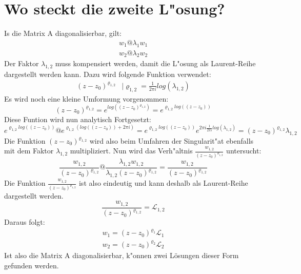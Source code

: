 \chapter{Wo steckt die zweite L"osung?\label{chapter:thema}}
\begin{refsection}

Is die Matrix A diagonalisierbar, gilt:
$$
\begin{matrix}
w_1 @ \lambda_1 w_1  \\
w_2 @ \lambda_2 w_2
\end{matrix}
$$
Der Faktor $\lambda_{1,2}$ muss kompensiert werden, damit die L"osung als Laurent-Reihe dargestellt werden kann. Dazu wird folgende Funktion verwendet: 
$$
\begin{matrix}
(z-z_0)^{\varrho_{1,2}} & | \varrho_{1,2} = \frac{1}{2\pi i}log(\lambda_{1,2})
\end{matrix}
$$
Es wird noch eine kleine Umformung vorgenommen:
$$
(z-z_0)^{\varrho_{1,2}} = e^{log((z-z_0)^{\varrho_{1,2}})} = e^{\varrho_{1,2} log((z-z_0))}
$$
Diese Funtion wird nun analytisch Fortgesetzt:
$$
e^{\varrho_{1,2} log((z-z_0))}  \text{@}  e^{\varrho_{1,2} (log((z-z_0)) + 2\pi i)}
= e^{\varrho_{1,2} log((z-z_0))}  e^{2\pi i\frac{1}{2\pi i}log(\lambda_{1,2})}
= (z-z_0)^{\varrho_{1,2}}  \lambda_{1,2}
$$
Die Funktion $(z-z_0)^{\varrho_{1,2}}$ wird also beim Umfahren der Singularit"at ebenfalls mit dem Faktor $\lambda_{1,2}$ multipliziert. Nun wird das Verh"altnis $\frac{w_{1,2}}{(z-z_0)^{\varrho_{1,2}}}$ untersucht:
$$
\frac{w_{1,2}}{(z-z_0)^{\varrho_{1,2}}} @ \frac{\lambda_{1,2} w_{1,2}}{\lambda_{1,2}(z-z_0)^{\varrho_{1,2}}} = \frac{w_{1,2}}{(z-z_0)^{\varrho_{1,2}}}
$$
Die Funktion $\frac{w_{1,2}}{(z-z_0)^{\varrho_{1,2}}}$ ist also eindeutig und kann deshalb als Laurent-Reihe dargestellt werden.
$$
\frac{w_{1,2}}{(z-z_0)^{\varrho_{1,2}}} = \mathcal{L}_{1,2}
$$
Daraus folgt:
$$
\begin{matrix}
w_1 = (z-z_0)^{\varrho_1} \mathcal{L}_1 \\
w_2 = (z-z_0)^{\varrho_2} \mathcal{L}_2
\end{matrix}
$$
Ist also die Matrix A diagonalisierbar, k"onnen zwei Lösungen dieser Form gefunden werden.


\printbibliography[heading=subbibliography]
\end{refsection}

